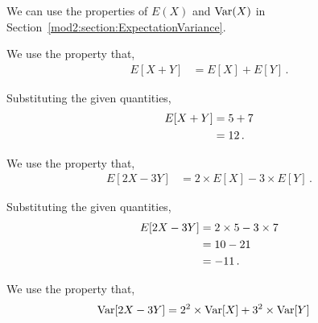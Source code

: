 %
%

\begin{subquestions}
	

\subquestion

We can use the properties of $E(X)$ and $\text{Var}(X)$ in Section~\ref{mod2:section:ExpectationVariance}.
\begin{subsubquestions}
	
\subsubquestion
We use the property that,
\begin{align}
	E[X+Y] & = E[X] + E[Y] \,.
\end{align}

Substituting the given quantities,
\begin{align}
	E[X+Y] & = 5 + 7 \nonumber \\
	       & = 12 \,.
\end{align}


\subsubquestion

We use the property that,
\begin{align}
	E[2X-3Y] & = 2 \times E[X] - 3 \times E[Y] \,.
\end{align}

Substituting the given quantities,
\begin{align}
	E[2X-3Y] & = 2 \times 5 - 3 \times 7 \nonumber \\
	& = 10 - 21 \nonumber \\
	& = -11 \,.
\end{align}


\subsubquestion

We use the property that,
\begin{align}
	\text{Var}[2X-3Y] & = 2^2 \times \text{Var}[X] + 3^2 \times \text{Var}[Y]
\end{align}


\end{subsubquestions}
\end{subquestions}
